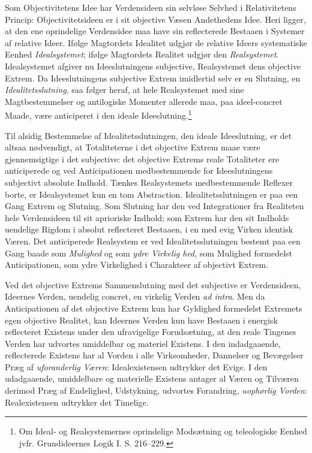 \documentclass[12pt]{book}
\newcommand{\opage}[1]{\marginnote{\footnotesize\textit{[#1]}}}
\begin{document}
Som Objectivitetens Idee har Verdensideen sin selvløse Selvhed i Relativitetens Princip: Objectivitetsideen er i sit objective Væsen Andethedens Idee. Heri ligger, at den ene oprindelige Verdensidee maa have sin reflecterede Bestaaen i Systemer af relative Ideer. Ifølge Magtordets Idealitet udgjør de relative Ideers systematiske Eenhed \emph{Idealsystemet}; ifølge Magtordets Realitet udgjør den \emph{Realsystemet}. Idealsystemet afgiver nu Ideeslutningens subjective, Realsystemet dens objective Extrem. Da Ideeslutningens subjective Extrem imidlertid selv er en Slutning, en \emph{Idealitetsslutning}, saa følger heraf, at hele Realsystemet med sine Magtbestemmelser og antilogiske Momenter allerede maa, paa ideel-concret Maade, være anticiperet i den ideale Ideeslutning.\footnote{Om Ideal- og Realsystemernes oprindelige Modsætning og teleologiske Eenhed jvfr. Grundideernes Logik I. S. 216--229.}%

Til alsidig Bestemmelse af Idealitetsslutningen, den ideale Ideeslutning, er det altsaa nødvendigt, at Totaliteterne i det objective Extrem maae være gjennemsigtige i det subjective: det objective Extrems reale Totaliteter ere anticiperede og ved Anticipationen medbestemmende for Ideeslutningens subjectivt absolute Indhold. Tænkes Realsystemets medbestemmende Reflexer borte, er Idealsystemet kun en tom Abstraction. Idealitetsslutningen er paa een Gang Extrem og Slutning. Som Slutning har den ved Integrationer fra Realiteten hele Verdensideen til sit aprioriske Indhold; som Extrem har den sit Indholds uendelige Rigdom i absolut reflecteret Bestaaen, i en med evig Virken identisk Væren. Det anticiperede Realsystem er ved Idealitetsslutningen bestemt paa een Gang baade som \emph{Mulighed} og som \emph{ydre Virkelig%
\opage{439}hed}, som Mulighed formedelst Anticipationen, som ydre Virkelighed i Charakteer af objectivt Extrem.

Ved det objective Extrems Sammenslutning med det subjective er Verdensideen, Ideernes Verden, uendelig concret, en virkelig Verden \textit{ad intra}. Men da Anticipationen af det objective Extrem kun har Gyldighed formedelst Extremets egen objective Realitet, kan Ideernes Verden kun have Bestaaen i energisk reflecteret Existens under den ufravigelige Forudsætning, at den reale Tingenes Verden har udvortes umiddelbar og materiel Existens. I den indadgaaende, reflecterede Existens har al Vorden i alle Virksomheder, Dannelser og Bevægelser Præg af \emph{uforanderlig Væren}: Idealexistensen udtrykker det Evige. I den udadgaaende, umiddelbare og materielle Existens antager al Væren og Tilværen derimod Præg af Endelighed, Udstykning, udvortes Forandring, \emph{uophørlig Vorden}: Realexistensen udtrykker det Timelige.
\end{document}

